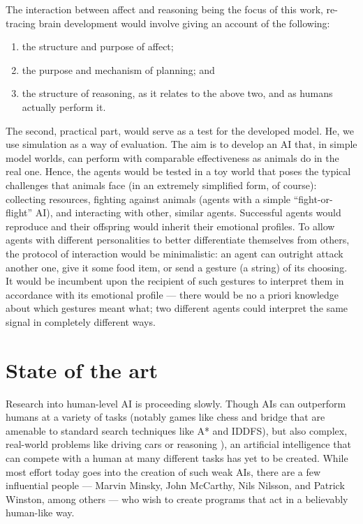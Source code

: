 \documentclass[bibliography=totoc ]{scrartcl}
\begin{document}
The interaction between affect and reasoning being the focus of this work, re-tracing brain development would involve giving an account of the following:

\begin{enumerate}
	\item the structure and purpose of affect;
	\item the purpose and mechanism of planning; and
	\item the structure of reasoning, as it relates to the above two, and as humans actually perform it.
\end{enumerate}

The second, practical part, would serve as a test for the developed model. He, we use simulation as a way of evaluation. The aim is to develop an AI that, in simple model worlds, can perform with comparable effectiveness as animals do in the real one. Hence, the agents would be tested in a toy world that poses the typical challenges that animals face (in an extremely simplified form, of course): collecting resources, fighting against animals (agents with a simple ``fight-or-flight'' AI), and interacting with other, similar agents. Successful agents would reproduce and their offspring would inherit their emotional profiles. To allow agents with different personalities to better differentiate themselves from others, the protocol of interaction would be minimalistic: an agent can outright attack another one, give it some food item, or send a gesture (a string) of its choosing. It would be incumbent upon the recipient of such gestures to interpret them in accordance with its emotional profile --- there would be no a priori knowledge about which gestures meant what; two different agents could interpret the same signal in completely different ways.

\section{State of the art}

Research into human-level AI is proceeding slowly. Though AIs can outperform humans at a variety of tasks (notably games like chess and bridge \cite{Schaeffer00} that are amenable to standard search techniques like A* and IDDFS), but also complex, real-world problems like driving cars \cite{googleCar, googleCar2} or reasoning \cite{asp1, acthex}), an artificial intelligence that can compete with a human at many different tasks has yet to be created. While most effort today goes into the creation of such weak AIs, there are a few influential people --- Marvin Minsky, John McCarthy, Nils Nilsson, and Patrick Winston, among others \cite[p. 27]{norvig} --- who wish to create programs that act in a believably human-like way.
\end{document}
